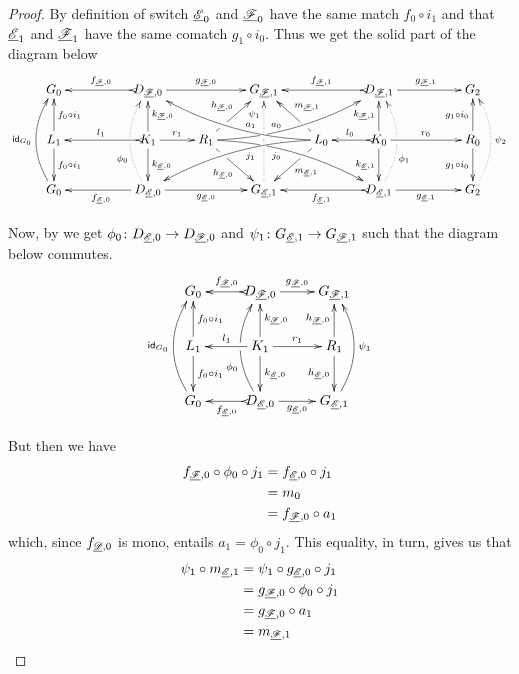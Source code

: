 \begin{proof}
	By definition of switch $\underline{\mathscr{E}}_0$ and $\underline{\mathscr{F}}_0$ have the same match $f_0\circ i_1$ and that $\underline{\mathscr{E}}_1$ and $\underline{\mathscr{F}}_1$ have the same comatch $g_1\circ i_0$. Thus we get the solid part of the diagram below
	\[\xymatrix@C=22pt{G_{0} && \ar@{>->}[ll]_{f_{\der{F},0}} D_{\der{F},0} \ar[rr]^{g_{\der{F},0}}&& G_{\der{F},1} && \ar@{>->}[ll]_{f_{\der{F},1}} D_{\der{F},1} \ar[rr]^{g_{\der{F},1}}&& G_{2}\\L_1 \ar[d]^{f_0\circ i_1} \ar[u]_{f_0\circ i_1}&& K_{1} \ar[d]^{k_{\der{E},0}} \ar[u]_{k_{\der{F},0}}\ar@{>->}[ll]_{l_1} \ar[r]^{r_1} & R_{1} \ar@/^.35cm/[drrr]|(.315)\hole_(.4){j_0} \ar[dr]|(.3)\hole_{h_{\der{E},0}} \ar@/_.35cm/[urrr]|(.315)\hole^(.4){a_0} \ar[ur]|(.3)\hole^{h_{\der{F},0}}& &L_{0} \ar@/_.35cm/[dlll]^(.4){j_1} \ar[dl]|(.3)\hole^{m_{\der{E},1}} \ar@/^.35cm/[ulll]_(.4){a_1} \ar[ul]|(.3)\hole_{m_{\der{F},1}}& K_{0} \ar[d]_{k_{\der{E},1}} \ar[u]^{k_{\der{F},1}}\ar@{>->}[l]_{l_{0}} \ar[rr]^{r_0} && R_{0} \ar[d]_{g_1\circ i_0} \ar[u]^{g_1\circ i_0}\\ \ar@/^.5cm/[uu]^{\id{G_0}} G_{0} && \ar[ll]^{f_{\der{E},0}} D_{\der{E},0} \ar@{.>}@/^.5cm/[uu]^(.33){\phi_{0}}|\hole \ar[rr]_{g_{\der{E},0}}&& G_{\der{E},1} \ar@{.>}[uu]^(.76){\psi_1}|(.45)\hole |(.55)\hole&& \ar@{>->}[ll]^{f_{\der{E},1}} D_{\der{E},1} \ar@{.>}@/_.5cm/[uu]_(.33){\phi_{1}}|\hole\ar[rr]_{g_{\der{E},1}}&& G_{2}\ar@{.>}@/_.5cm/[uu]_{\psi_2}}\]
	
Now, by  we get $\phi_0\colon D_{\underline{\mathscr{E}},0}\to D_{\underline{\mathscr{F}},0}$ and $\psi_1 \colon G_{\underline{\mathscr{E}},1}\to G_{\underline{\mathscr{F}},1}$ such that the diagram below commutes.
\[\xymatrix{G_{0} & \ar@{>->}[l]_{f_{\der{F},0}} D_{\der{F},0} \ar[r]^{g_{\der{F},0}}& G_{\der{F},1} \\L_1 \ar[d]^{f_0\circ i_1} \ar[u]_{f_0\circ i_1}& K_{1} \ar[d]^{k_{\der{E},0}} \ar[u]_{k_{\der{F},0}}\ar[l]_{l_1} \ar[r]^{r_1} & R_{1}  \ar[d]_{h_{\der{E},0}}  \ar[u]^{h_{\der{F},0}}\\ \ar@/^.5cm/[uu]^{\id{G_0}} G_{0} & \ar@{>->}[l]^{f_{\der{E},0}} D_{\der{E},0} \ar@/^.5cm/[uu]^(.33){\phi_{0}}|\hole \ar[r]_{g_{\der{E},0}}& G_{\der{E},1} \ar@/_.5cm/[uu]_{\psi_1}}\]

 But then we have
 \begin{align*}
 	f_{\underline{\mathscr{F}},0}\circ \phi_0\circ j_1&=f_{\underline{\mathscr{E}},0} \circ j_1\\&=m_0\\&=f_{\underline{\mathscr{F}},0}\circ a_1 \end{align*}
	which, since $f_{\underline{\mathscr{D}},0}$ is mono, entails $a_1= \phi_0\circ j_1$.	This equality, in turn, gives us that
	\begin{align*}
	\psi_1\circ m_{\underline{\mathscr{E}},1}&=\psi_1 \circ g_{\underline{\mathscr{E}},0}\circ j_1\\&=g_{\underline{\mathscr{F}},0}\circ \phi_0\circ j_1\\&=g_{\underline{\mathscr{F}},0}\circ a_1\\&=m_{\underline{\mathscr{F}},1}
	\end{align*}
	

\end{proof}
